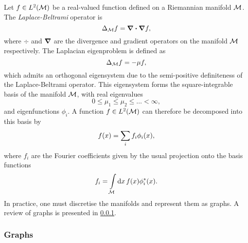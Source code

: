 Let \(f \in L^{2}(\mathcal{M})\) be a real-valued function defined on a Riemannian manifold \(\mathcal{M}{}\).
The \emph{Laplace-Beltrami} operator is
%
\begin{equation}
	\Delta_{\mathcal{M}} f
	= \div{\grad{f}},
\end{equation}
%
where \(\div{}\) and \(\grad{}\) are the divergence and gradient operators on the manifold \(\mathcal{M}{}\) respectively.
The Laplacian eigenproblem is defined as
%
\begin{equation}
	\Delta_{\mathcal{M}} f
	= -\mu f,
\end{equation}
%
which admits an orthogonal eigensystem due to the semi-positive definiteness of the Laplace-Beltrami operator.
This eigensystem forms the square-integrable basis of the manifold \(\mathcal{M}{}\), with real eigenvalues
%
\begin{equation}
	0 \leq \mu_{1} \leq \mu_{2} \leq \ldots < \infty, %
\end{equation}
%
and eigenfunctions \(\phi_{i}\).
A function \(f \in L^{2}(\mathcal{M})\) can therefore be decomposed into this basis by
%
\begin{equation}
	f(x)
	= \sum\limits_{i} f_{i} \phi_{i}(x),
\end{equation}
%
where \(f_{i}\) are the Fourier coefficients given by the usual projection onto the basis functions
%
\begin{equation}
	f_{i}
	= \int\limits_{\mathcal{M}} \dd{x} f(x) \phi_{i}^{\ast}(x).
\end{equation}
%
In practice, one must discretise the manifolds and represent them as graphs.
A review of graphs is presented in \cref{sec:chapter4_graphs}.

\subsubsection{Graphs}\label{sec:chapter4_graphs}

